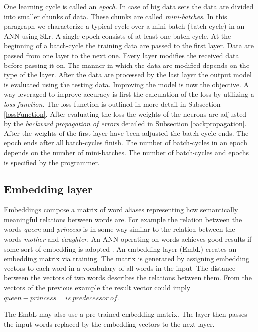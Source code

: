 One learning cycle is called an \textit{epoch}. In case of big data sets the data are divided into smaller chunks of data. These chunks are called \textit{mini-batches}. In this paragraph we characterize a typical cycle over a mini-batch (batch-cycle) in an ANN using SLr. A single epoch consists of at least one batch-cycle. At the beginning of a batch-cycle the training data are passed to the first layer. Data are passed from one layer to the next one. Every layer modifies the received data before passing it on. The manner in which the data are modified depends on the type of the layer. After the data are processed by the last layer the output model is evaluated using the testing data. Improving the model is now the objective. A way leveraged to improve accuracy is first the calculation of the loss by utilizing a \textit{loss function}. The loss function is outlined in more detail in Subsection \ref{lossFunction}. After evaluating the loss the weights of the neurons are adjusted by the \textit{backward propagation of errors} detailed in Subsection \ref{backpropagation}. After the weights of the first layer have been adjusted the batch-cycle ends. The epoch ends after all batch-cycles finish. The number of batch-cycles in an epoch depends on the number of mini-batches. The number of batch-cycles and epochs is specified by the programmer. 

\subsection{Embedding layer}\label{embeddingLayers}
Embeddings \cite{embeddingsOverview} compose a matrix of word aliases representing how semantically meaningful relations between words are. For example the relation between the words \textit{queen} and \textit{princess} is in some way similar to the relation between the words \textit{mother} and \textit{daughter}. An ANN operating on words achieves good results if some sort of embedding is adopted \cite{goodToUseEmbeddings}. An embedding layer (EmbL) creates an embedding matrix via training. The matrix is generated by assigning embedding vectors to each word in a vocabulary of all words in the input. The distance between the vectors of two words describes the relations between them. From the vectors of the previous example the result vector could imply $queen - princess = is~predecessor~of$. 

The EmbL may also use a pre-trained embedding matrix. The layer then passes the input words replaced by the embedding vectors to the next layer. 

